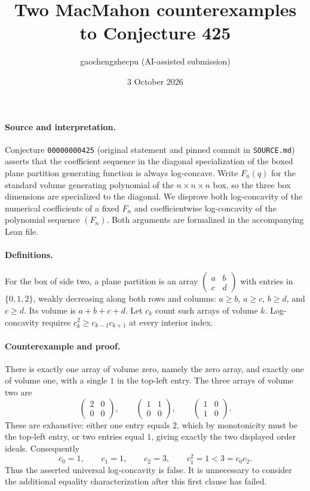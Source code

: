 \documentclass[10pt]{article}
\title{Two MacMahon counterexamples to Conjecture 425}
\author{gaochengzhecpu (AI-assisted submission)}
\date{3 October 2026}
\makeatletter
\renewcommand{\maketitle}{\begin{center}
{\Large\bfseries\@title\par}\vspace{0.6em}
{\small\@author\par\@date}
\end{center}\vspace{0.5em}}
\makeatother
\begin{document}
\maketitle
\paragraph{Source and interpretation.}
Conjecture \texttt{00000000425} (original statement and pinned commit in
\texttt{SOURCE.md}) asserts that the
coefficient sequence in the diagonal specialization of the boxed plane
partition generating function is always log-concave. Write $F_n(q)$ for the
standard volume generating polynomial of the $n\times n\times n$ box,
so the three box dimensions are specialized to the diagonal.
We disprove both log-concavity of the numerical coefficients of a fixed
$F_n$ and coefficientwise log-concavity of the polynomial sequence $(F_n)$.
Both arguments are formalized in the accompanying Lean file.

\paragraph{Definitions.}
For the box of side two, a plane partition is an array
$\left(\begin{smallmatrix}a&b\\c&d\end{smallmatrix}\right)$ with entries in
$\{0,1,2\}$, weakly decreasing along both rows and columns:
$a\ge b$, $a\ge c$, $b\ge d$, and $c\ge d$.
Its volume is $a+b+c+d$. Let $c_k$ count such arrays of volume $k$.
Log-concavity requires $c_k^2\ge c_{k-1}c_{k+1}$ at every interior index.

\paragraph{Counterexample and proof.}
There is exactly one array of volume zero, namely the zero array, and exactly
one of volume one, with a single $1$ in the top-left entry. The three arrays
of volume two are
\[
\begin{pmatrix}2&0\\0&0\end{pmatrix},\qquad
\begin{pmatrix}1&1\\0&0\end{pmatrix},\qquad
\begin{pmatrix}1&0\\1&0\end{pmatrix}.
\]
These are exhaustive: either one entry equals $2$, which by monotonicity
must be the top-left entry, or two entries equal $1$, giving exactly the
two displayed order ideals. Consequently
\[
c_0=1,\qquad c_1=1,\qquad c_2=3,\qquad
c_1^2=1<3=c_0c_2.
\]
Thus the asserted universal log-concavity is false. It is unnecessary to
consider the additional equality characterization after this first clause
has failed.
\end{document}

